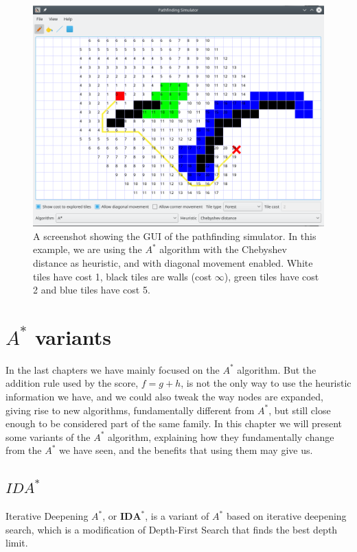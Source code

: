 \documentclass[12pt]{report}
\begin{document}
\begin{figure}
\centering
\includegraphics[width=1\linewidth]{pathfinding-simulator}
\caption{A screenshot showing the GUI of the pathfinding simulator. In this example, we are using the $A^*$ algorithm with the Chebyshev distance as heuristic, and with diagonal movement enabled. White tiles have cost 1, black tiles are walls (cost $\infty$), green tiles have cost 2 and blue tiles have cost 5.}
\label{fig:pathfinding-simulator}
\end{figure}


\chapter{$A^*$ variants}

In the last chapters we have mainly focused on the $A^*$ algorithm. But the addition rule used by the score, $f = g + h$, is not the only way to use the heuristic information we have, and we could also tweak the way nodes are expanded, giving rise to new algorithms, fundamentally different from $A^*$, but still close enough to be considered part of the same family. In this chapter we will present some variants of the $A^*$ algorithm, explaining how they fundamentally change from the $A^*$ we have seen, and the benefits that using them may give us.


\section{$IDA^*$}
Iterative Deepening $A^*$, or $\bm{IDA^*}$, is a variant of $A^*$ based on iterative deepening search, which is a modification of Depth-First Search that finds the best depth limit. %
\end{document}
